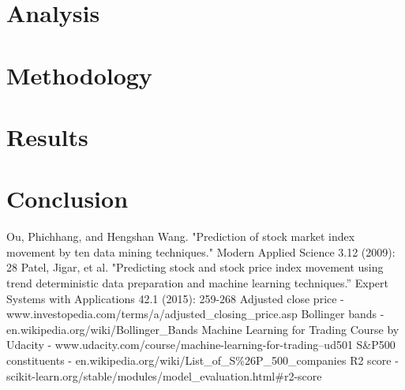 \documentclass[10pt]{report}
\begin{document}
\section{Analysis}


\section{Methodology}

\section{Results}

\section{Conclusion}

\begin{thebibliography}{}

Ou, Phichhang, and Hengshan Wang. "Prediction of stock market index movement by ten data mining techniques." Modern Applied Science 3.12 (2009): 28
Patel, Jigar, et al. "Predicting stock and stock price index movement using trend deterministic data preparation and machine learning techniques.” Expert Systems with Applications 42.1 (2015): 259-268
Adjusted close price - www.investopedia.com/terms/a/adjusted\_closing\_price.asp
Bollinger bands - en.wikipedia.org/wiki/Bollinger\_Bands
Machine Learning for Trading Course by Udacity - www.udacity.com/course/machine-learning-for-trading--ud501
S\&P500 constituents - en.wikipedia.org/wiki/List\_of\_S\%26P\_500\_companies
R2 score - scikit-learn.org/stable/modules/model\_evaluation.html\#r2-score

\end{thebibliography}
\end{document}
